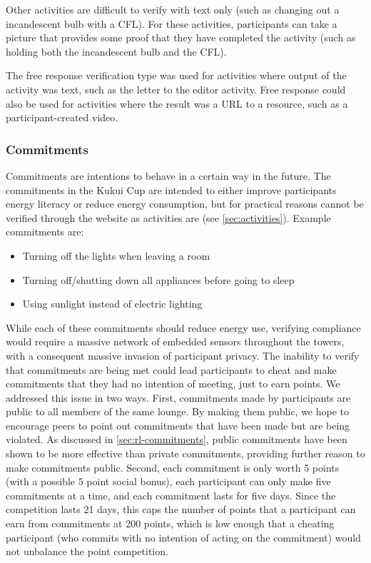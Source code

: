 Other activities are difficult to verify with text only (such as changing out a incandescent bulb with a CFL). For these activities, participants can take a picture that provides some proof that they have completed the activity (such as holding both the incandescent bulb and the CFL).

The free response verification type was used for activities where output of the activity was text, such as the letter to the editor activity. Free response could also be used for activities where the result was a URL to a resource, such as a participant-created video.


\subsubsection{Commitments}
\label{sec:commitments}

Commitments are intentions to behave in a certain way in the future. The commitments in the Kukui Cup are intended to either improve participants energy literacy or reduce energy consumption, but for practical reasons cannot be verified through the website as activities are (see \autoref{sec:activities}). Example commitments are:

\begin{itemize}
	\item Turning off the lights when leaving a room
	\item Turning off/shutting down all appliances before going to sleep
	\item Using sunlight instead of electric lighting
\end{itemize}

While each of these commitments should reduce energy use, verifying compliance would require a massive network of embedded sensors throughout the towers, with a consequent massive invasion of participant privacy. The inability to verify that commitments are being met could lead participants to cheat and make commitments that they had no intention of meeting, just to earn points. We addressed this issue in two ways. First, commitments made by participants are public to all members of the same lounge. By making them public, we hope to encourage peers to point out commitments that have been made but are being violated. As discussed in \autoref{sec:rl-commitments}, public commitments have been shown to be more effective than private commitments, providing further reason to make commitments public. Second, each commitment is only worth 5 points (with a possible 5 point social bonus), each participant can only make five commitments at a time, and each commitment lasts for five days. Since the competition lasts 21 days, this caps the number of points that a participant can earn from commitments at 200 points, which is low enough that a cheating participant (who commits with no intention of acting on the commitment) would not unbalance the point competition.

